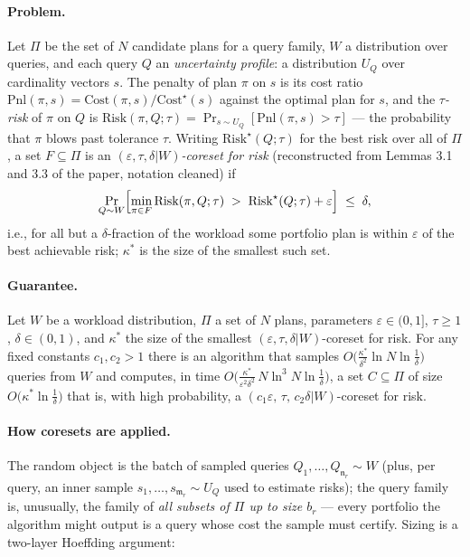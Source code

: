 \paragraph{Problem.}
Let $\Pi$ be the set of $N$ candidate plans for a query family, $W$ a
distribution over queries, and each query $Q$ an \emph{uncertainty
profile}: a distribution $U_Q$ over cardinality vectors $s$. The
penalty of plan $\pi$ on $s$ is its cost ratio
$\mathrm{Pnl}(\pi, s) = \mathrm{Cost}(\pi,s)/\mathrm{Cost}^{\star}(s)$
against the optimal plan for $s$, and the \emph{$\tau$-risk} of $\pi$
on $Q$ is $\mathrm{Risk}(\pi, Q;\tau) = \Pr_{s \sim
U_Q}[\mathrm{Pnl}(\pi,s) > \tau]$ --- the probability that $\pi$ blows
past tolerance $\tau$. Writing $\mathrm{Risk}^{\star}(Q;\tau)$ for the
best risk over all of $\Pi$, a set $F \subseteq \Pi$ is an
\emph{$(\varepsilon,\tau,\delta|W)$-coreset for risk} (reconstructed
from Lemmas 3.1 and 3.3 of the paper, notation cleaned) if
\[
\Pr_{Q \sim W}\Bigl[\min_{\pi \in F} \mathrm{Risk}(\pi,Q;\tau) \;>\;
\mathrm{Risk}^{\star}(Q;\tau) + \varepsilon\Bigr] \;\le\; \delta,
\]
i.e., for all but a $\delta$-fraction of the workload some portfolio
plan is within $\varepsilon$ of the best achievable risk; $\kappa^*$ is
the size of the smallest such set.

\paragraph{Guarantee.}

\begin{theorem}\label{thm:cor-qo-main}
Let $W$ be a workload distribution, $\Pi$ a set of $N$ plans,
parameters $\varepsilon \in (0,1]$, $\tau \ge 1$, $\delta \in (0,1)$,
and $\kappa^*$ the size of the smallest
$(\varepsilon,\tau,\delta|W)$-coreset for risk. For any fixed
constants $c_1, c_2 > 1$ there is an algorithm that samples
$O\bigl(\tfrac{\kappa^*}{\delta^2}\ln N \ln\tfrac1\delta\bigr)$ queries
from $W$ and computes, in time
$O\bigl(\tfrac{\kappa^*}{\varepsilon^2\delta^2}\,N \ln^3 N
\ln\tfrac1\delta\bigr)$, a set $C \subseteq \Pi$ of size
$O\bigl(\kappa^* \ln\tfrac1\delta\bigr)$ that is, with high
probability, a $(c_1\varepsilon,\,\tau,\,c_2\delta|W)$-coreset for
risk. \eop
\end{theorem}

\paragraph{How coresets are applied.}
The random object is the batch of sampled queries $Q_1, \dots,
Q_{\mathfrak{n}_r} \sim W$ (plus, per query, an inner sample
$s_1,\dots, s_{\mathfrak{m}_r} \sim U_Q$ used to estimate risks); the
query family is, unusually, the family of \emph{all subsets of $\Pi$ up
to size $b_r$} --- every portfolio the algorithm might output is a
query whose cost the sample must certify. Sizing is a two-layer
Hoeffding argument:

